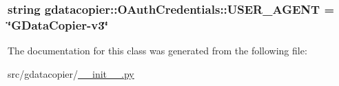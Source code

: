 \hypertarget{classgdatacopier_1_1_o_auth_credentials_a70092cec199a5af5fd617580eac40a6b}{
\subsubsection[{\-U\-S\-E\-R\-\_\-\-A\-G\-E\-N\-T}]{\setlength{\rightskip}{0pt plus 5cm}string {\bf gdatacopier\-::\-O\-Auth\-Credentials\-::\-U\-S\-E\-R\-\_\-\-A\-G\-E\-N\-T} = \char`\"{}\-G\-Data\-Copier-\/v3\char`\"{}}}\label{classgdatacopier_1_1_o_auth_credentials_a70092cec199a5af5fd617580eac40a6b}


\-The documentation for this class was generated from the following file\-:\begin{DoxyCompactItemize}
\item 
src/gdatacopier/\hyperlink{____init_____8py}{\-\_\-\-\_\-init\-\_\-\-\_\-.\-py}\end{DoxyCompactItemize}
